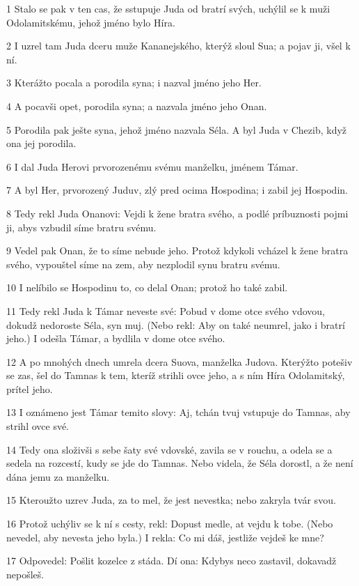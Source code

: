 \par 1 Stalo se pak v ten cas, že sstupuje Juda od bratrí svých, uchýlil se k muži Odolamitskému, jehož jméno bylo Híra.
\par 2 I uzrel tam Juda dceru muže Kananejského, kterýž sloul Sua; a pojav ji, všel k ní.
\par 3 Kterážto pocala a porodila syna; i nazval jméno jeho Her.
\par 4 A pocavši opet, porodila syna; a nazvala jméno jeho Onan.
\par 5 Porodila pak ješte syna, jehož jméno nazvala Séla. A byl Juda v Chezib, když ona jej porodila.
\par 6 I dal Juda Herovi prvorozenému svému manželku, jménem Támar.
\par 7 A byl Her, prvorozený Juduv, zlý pred ocima Hospodina; i zabil jej Hospodin.
\par 8 Tedy rekl Juda Onanovi: Vejdi k žene bratra svého, a podlé príbuznosti pojmi ji, abys vzbudil síme bratru svému.
\par 9 Vedel pak Onan, že to síme nebude jeho. Protož kdykoli vcházel k žene bratra svého, vypouštel síme na zem, aby nezplodil synu bratru svému.
\par 10 I nelíbilo se Hospodinu to, co delal Onan; protož ho také zabil.
\par 11 Tedy rekl Juda k Támar neveste své: Pobud v dome otce svého vdovou, dokudž nedoroste Séla, syn muj. (Nebo rekl: Aby on také neumrel, jako i bratrí jeho.) I odešla Támar, a bydlila v dome otce svého.
\par 12 A po mnohých dnech umrela dcera Suova, manželka Judova. Kterýžto potešiv se zas, šel do Tamnas k tem, kteríž strihli ovce jeho, a s ním Híra Odolamitský, prítel jeho.
\par 13 I oznámeno jest Támar temito slovy: Aj, tchán tvuj vstupuje do Tamnas, aby strihl ovce své.
\par 14 Tedy ona složivši s sebe šaty své vdovské, zavila se v rouchu, a odela se a sedela na rozcestí, kudy se jde do Tamnas. Nebo videla, že Séla dorostl, a že není dána jemu za manželku.
\par 15 Kteroužto uzrev Juda, za to mel, že jest nevestka; nebo zakryla tvár svou.
\par 16 Protož uchýliv se k ní s cesty, rekl: Dopust medle, at vejdu k tobe. (Nebo nevedel, aby nevesta jeho byla.) I rekla: Co mi dáš, jestliže vejdeš ke mne?
\par 17 Odpovedel: Pošlit kozelce z stáda. Dí ona: Kdybys neco zastavil, dokavadž nepošleš.
